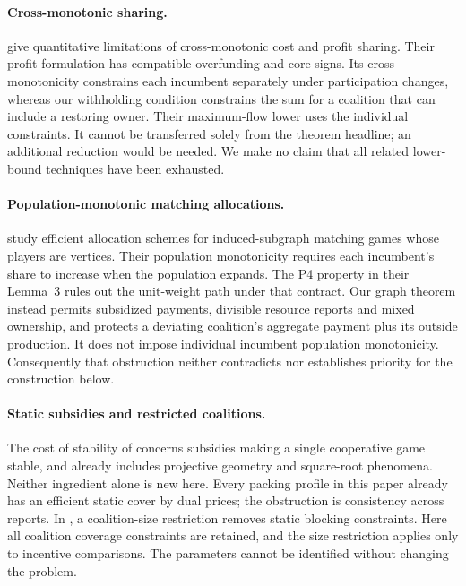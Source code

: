 \documentclass[11pt]{article}
\theoremstyle{definition}\newtheorem{definition}[theorem]{Definition}
\theoremstyle{remark}\newtheorem{remark}[theorem]{Remark}
\begin{document}
\paragraph{Cross-monotonic sharing.}
\citet{ImmorlicaEtAl2008} give quantitative limitations of cross-monotonic
cost and profit sharing. Their profit formulation has compatible overfunding
and core signs. Its cross-monotonicity constrains each incumbent separately
under participation changes, whereas our withholding condition constrains the
sum for a coalition that can include a restoring owner. Their maximum-flow
lower uses the individual constraints. It cannot be transferred solely from
the theorem headline; an additional reduction would be needed. We make no
claim that all related lower-bound techniques have been exhausted.

\paragraph{Population-monotonic matching allocations.}
\citet{XiaoFang2021} study efficient allocation schemes for induced-subgraph
matching games whose players are vertices. Their population monotonicity
requires each incumbent's share to increase when the population expands.
The P4 property in their Lemma~3 rules out the unit-weight path under that
contract. Our graph theorem instead permits subsidized payments, divisible
resource reports and mixed ownership, and protects a deviating coalition's
aggregate payment plus its outside production. It does not impose individual
incumbent population monotonicity. Consequently that obstruction neither
contradicts nor establishes priority for the construction below.

\paragraph{Static subsidies and restricted coalitions.}
The cost of stability of \citet{BachrachEtAl2009} concerns subsidies making a
single cooperative game stable, and already includes projective geometry and
square-root phenomena. Neither ingredient alone is new here. Every packing
profile in this paper already has an efficient static cover by dual prices;
the obstruction is consistency across reports.
In \citet{MeirEtAl2011}, a coalition-size restriction removes static blocking
constraints. Here all coalition coverage constraints are retained, and the
size restriction applies only to incentive comparisons. The parameters cannot
be identified without changing the problem.
\end{document}
